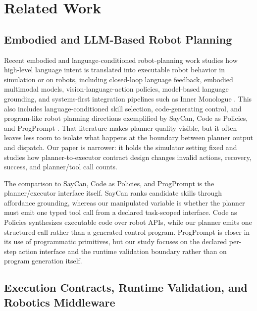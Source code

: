 \section{Related Work}

\subsection{Embodied and LLM-Based Robot Planning}

Recent embodied and language-conditioned robot-planning work studies how
high-level language intent is translated into executable robot behavior in
simulation or on robots, including closed-loop language feedback, embodied
multimodal models, vision-language-action policies, model-based language
grounding, and systems-first integration pipelines such as Inner Monologue
\cite{huang2022inner,driess2023palme,brohan2023rt2,huang2023voxposer,liu2024okrobot}.
This also includes language-conditioned skill selection, code-generating
control, and program-like robot planning directions exemplified by SayCan,
Code as Policies, and ProgPrompt
\cite{ahn2022saycan,liang2022codeaspolicies,singh2022progprompt}. That
literature makes planner quality visible, but it often leaves less room to
isolate what happens at the boundary between planner output and dispatch. Our
paper is narrower: it holds the simulator setting fixed and studies how
planner-to-executor contract design changes invalid actions, recovery, success,
and planner/tool call counts.

The comparison to SayCan, Code as Policies, and ProgPrompt is the
planner/executor interface itself. SayCan ranks candidate skills through
affordance grounding, whereas our manipulated variable is whether the planner
must emit one typed tool call from a declared task-scoped interface. Code as
Policies synthesizes executable code over robot APIs, while our planner emits
one structured call rather than a generated control program. ProgPrompt is
closer in its use of programmatic primitives, but our study focuses on the
declared per-step action interface and the runtime validation boundary rather
than on program generation itself.

\subsection{Execution Contracts, Runtime Validation, and Robotics Middleware}


